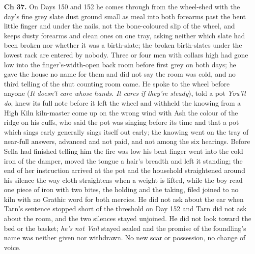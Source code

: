 \documentclass{design/chronicle}
\begin{document}
{\textbf{Ch 37.} On Days 150 and 152 he comes through from the wheel-shed with the day’s fine grey slate dust ground small as meal into both forearms past the bent little finger and under the nails, not the bone-coloured slip of the wheel, and keeps dusty forearms and clean ones on one tray, asking neither which slate had been broken nor whether it was a birth-slate; the broken birth-slates under the lowest rack are entered by nobody. Three or four men with collars high had gone low into the finger’s-width-open back room before first grey on both days; he gave the house no name for them and did not say the room was cold, and no third telling of the shut counting room came. He spoke to the wheel before anyone (\emph{It doesn’t care whose hands. It cares if they’re steady}), told a pot \emph{You’ll do}, knew its full note before it left the wheel and withheld the knowing from a High Kiln kiln-master come up on the wrong wind with Ash the colour of the ridge on his cuffs, who said the pot was singing before its time and that a pot which sings early generally sings itself out early; the knowing went on the tray of near-full answers, advanced and not paid, and not among the six hearings. Before Sella had finished telling him the fire was low his bent finger went into the cold iron of the damper, moved the tongue a hair’s breadth and left it standing; the end of her instruction arrived at the pot and the household straightened around his silence the way cloth straightens when a weight is lifted, while the boy read one piece of iron with two bites, the holding and the taking, filed joined to no kiln with no Grathic word for both mercies. He did not ask about the ear when Tarn’s sentence stopped short of the threshold on Day 152 and Tarn did not ask about the room, and the two silences stayed unjoined. He did not look toward the bed or the basket; \emph{he’s not Vail} stayed sealed and the promise of the foundling’s name was neither given nor withdrawn. No new scar or possession, no change of voice.

}
\end{document}
